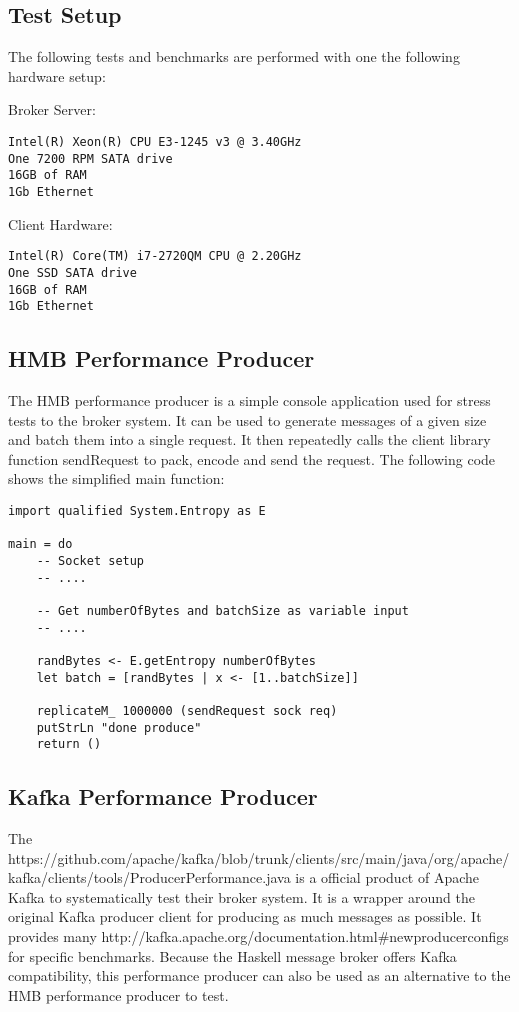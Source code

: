 \subsection{Test Setup}

The following tests and benchmarks are performed with one the following hardware
setup:

Broker Server:
\begin{verbatim}
Intel(R) Xeon(R) CPU E3-1245 v3 @ 3.40GHz
One 7200 RPM SATA drive
16GB of RAM
1Gb Ethernet 
\end{verbatim}

Client Hardware:
\begin{verbatim}
Intel(R) Core(TM) i7-2720QM CPU @ 2.20GHz
One SSD SATA drive
16GB of RAM 
1Gb Ethernet
\end{verbatim}

\subsection{HMB Performance Producer}
\label{conc-eval-hmbperformanceprod}

The HMB performance producer is a simple console application used for stress
tests to the broker system. It can be used to generate messages of a given size
and batch them into a single request. It then repeatedly calls the client
library function sendRequest to pack, encode and send the request. The following
code shows the simplified main function:

\begin{lstlisting}
import qualified System.Entropy as E

main = do 
    -- Socket setup 
    -- ....

    -- Get numberOfBytes and batchSize as variable input 
    -- ....

    randBytes <- E.getEntropy numberOfBytes 
    let batch = [randBytes | x <- [1..batchSize]]

    replicateM_ 1000000 (sendRequest sock req) 
    putStrLn "done produce"
    return ()

\end{lstlisting}

\subsection{Kafka Performance Producer}
\label{conc-eval-kafkaperformanceprod}

The 
{https://github.com/apache/kafka/blob/trunk/clients/src/main/java/org/apache/kafka/clients/tools/ProducerPerformance.java}
is a official product of Apache Kafka to systematically test their broker
system. It is a wrapper around the original Kafka producer client for producing
as much messages as possible. It provides many 
{http://kafka.apache.org/documentation.html\#newproducerconfigs} for specific
benchmarks. Because the Haskell message broker offers Kafka compatibility, this
performance producer can also be used as an alternative to the HMB performance
producer to test.

